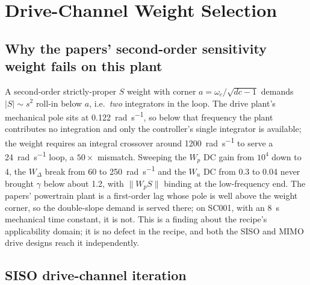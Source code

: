 \documentclass[energies,article,submit,pdftex,oneauthor]{Definitions/mdpi}
\begin{document}
\section{Drive-Channel Weight Selection}
\label{app:driveweights}

\subsection{Why the papers' second-order sensitivity weight fails on this plant}

A second-order strictly-proper $S$ weight with corner $a = \omega_c/\sqrt{dc-1}$ demands
$|S|\sim s^2$ roll-in below $a$, i.e.\ \emph{two} integrators in the loop. The drive plant's
mechanical pole sits at \SI{0.122}{\radian\per\second}, so below that frequency the plant
contributes no integration and only the controller's single integrator is available; the weight
requires an integral crossover around \SI{1200}{\radian\per\second} to serve a
\SI{24}{\radian\per\second} loop, a $50\times$ mismatch. Sweeping the $W_p$ DC gain from $10^4$
down to 4, the $W_{\Delta}$ break from 60 to \SI{250}{\radian\per\second} and the $W_u$ DC from 0.3 to
0.04 never brought $\gamma$ below about 1.2, with $\|W_p S\|$ binding at the low-frequency end.
The papers' powertrain plant is a first-order lag whose pole is well above the weight corner, so
the double-slope demand is served there; on SC001, with an \SI{8}{\second} mechanical time
constant, it is not. This is a finding about the recipe's applicability domain; it is no defect in
the recipe, and both the SISO and MIMO drive designs reach it independently.

\subsection{SISO drive-channel iteration}
\end{document}
